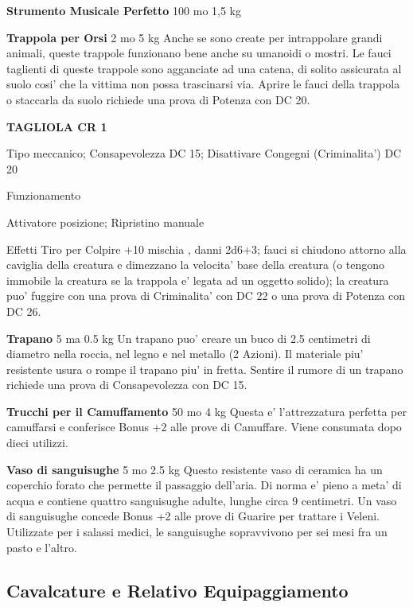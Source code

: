 \documentclass[a4paper,11pt,twoside,openany]{dndbook}
\begin{document}
{\textbf{Strumento Musicale Perfetto} 100 mo 1,5 kg

\textbf{Trappola per Orsi} 2 mo 5 kg Anche se sono create per intrappolare grandi animali, queste trappole funzionano bene anche su umanoidi o mostri. Le fauci taglienti di queste trappole sono agganciate ad una catena, di solito assicurata al suolo cosi' che la vittima non possa trascinarsi via. Aprire le fauci della trappola o staccarla da suolo richiede una prova di Potenza con DC 20.

\textbf{TAGLIOLA CR 1}

Tipo meccanico; Consapevolezza DC 15; Disattivare Congegni (Criminalita') DC 20

Funzionamento

Attivatore posizione; Ripristino manuale

Effetti Tiro per Colpire +10 mischia , danni 2d6+3; fauci si chiudono attorno alla caviglia della creatura e dimezzano la velocita' base della creatura (o tengono immobile la creatura se la trappola e' legata ad un oggetto solido); la creatura puo' fuggire con una prova di Criminalita' con DC 22 o una prova di Potenza con DC 26.

\textbf{Trapano} 5 ma 0.5 kg Un trapano puo' creare un buco di 2.5 centimetri di diametro nella roccia, nel legno e nel metallo (2 Azioni). Il materiale piu' resistente usura o rompe il trapano piu' in fretta. Sentire il rumore di un trapano richiede una prova di Consapevolezza con DC 15.

\textbf{Trucchi per il Camuffamento} 50 mo 4 kg Questa e' l'attrezzatura perfetta per camuffarsi e conferisce Bonus +2 alle prove di Camuffare. Viene consumata dopo dieci utilizzi.

\textbf{Vaso di sanguisughe} 5 mo 2.5 kg Questo resistente vaso di ceramica ha un coperchio forato che permette il passaggio dell'aria. Di norma e' pieno a meta' di acqua e contiene quattro sanguisughe adulte, lunghe circa 9 centimetri. Un vaso di sanguisughe concede Bonus +2 alle prove di Guarire per trattare i Veleni. Utilizzate per i salassi medici, le sanguisughe sopravvivono per sei mesi fra un pasto e l'altro.

\pagebreak

\subsection{Cavalcature e Relativo Equipaggiamento}

\label{cavalcature-e-relativo-equipaggiamento}

}
\end{document}
